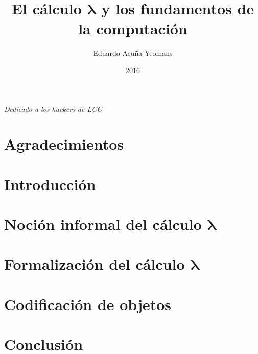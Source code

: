 \documentclass[letterpaper, twoside, openright, 11pt]{book}
\theoremstyle{plain}%
\theoremstyle{definition}
\theoremstyle{remark}
\newcommand{\bs}{\boldsymbol}
\begin{document}
\title{El cálculo \( \bs{λ} \) y los fundamentos de la computación}
\author{Eduardo Acuña Yeomans}
\date{2016}

\maketitle

\frontmatter

\cleardoublepage\thispagestyle{empty}
\vspace*{15 cm}
\begin{flushright}\it
  Dedicado a los hackers de LCC
\end{flushright}

\chapter*{Agradecimientos}
\thispagestyle{empty}


\tableofcontents

\mainmatter

\chapter*{Introducción}
\label{ch:introduccion}


\chapter{Noción informal del cálculo \texorpdfstring{$ \bs{λ} $}{lambda}}
\label{ch:nocion-informal}


\chapter{Formalización del cálculo \texorpdfstring{$ \bs{λ} $}{lambda}}
\label{ch:formalizacion}


\chapter{Codificación de objetos}
\label{ch:codificacion}


\chapter*{Conclusión}
\label{ch:conclusion}

\end{document}
